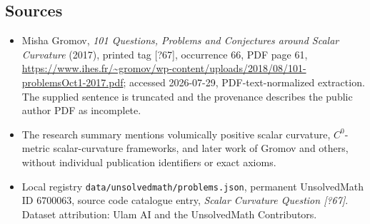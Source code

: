 \documentclass[11pt]{article}
\begin{document}
\subsection{Sources}
\begin{itemize}
\item Misha Gromov, \emph{101 Questions, Problems and Conjectures around Scalar Curvature} (2017), printed tag [?67], occurrence 66, PDF page 61, \url{https://www.ihes.fr/~gromov/wp-content/uploads/2018/08/101-problemsOct1-2017.pdf}; accessed 2026-07-29, PDF-text-normalized extraction. The supplied sentence is truncated and the provenance describes the public author PDF as incomplete.
\item The research summary mentions volumically positive scalar curvature, $C^0$-metric scalar-curvature frameworks, and later work of Gromov and others, without individual publication identifiers or exact axioms.
\item Local registry \texttt{data/unsolvedmath/problems.json}, permanent UnsolvedMath ID $6700063$, source code catalogue entry, \emph{Scalar Curvature Question [?67]}. Dataset attribution: Ulam AI and the UnsolvedMath Contributors.
\end{itemize}
\end{document}
